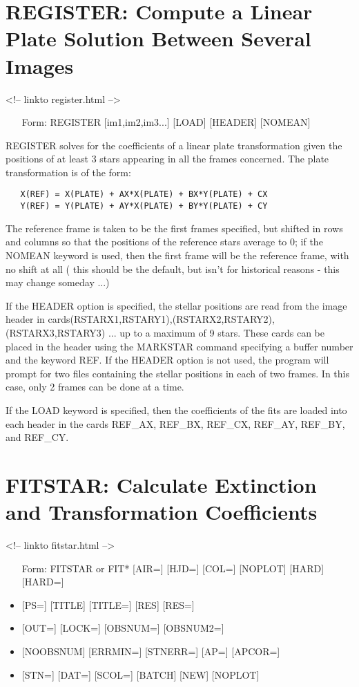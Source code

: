 \section{REGISTER: Compute a Linear Plate Solution Between Several Images}
\begin{rawhtml}
<!-- linkto register.html -->
\end{rawhtml}
\begin{itemize}
  \item[Form: REGISTER {[im1,im2,im3...]} {[LOAD]} {[HEADER]} {[NOMEAN]}\hfill]{}
\end{itemize}

REGISTER solves for the coefficients of a linear plate transformation given
the positions of at least 3 stars appearing in all the frames
concerned. The plate transformation is of the form:
\begin{verbatim}
   X(REF) = X(PLATE) + AX*X(PLATE) + BX*Y(PLATE) + CX
   Y(REF) = Y(PLATE) + AY*X(PLATE) + BY*Y(PLATE) + CY
\end{verbatim}
The reference frame is taken to be the first frames specified, but shifted
in rows and columns so that the positions of the reference stars average to
0; if the NOMEAN keyword is used, then the first frame will be the
reference frame, with no shift at all ( this should be the default, but
isn't for historical reasons - this may change someday ...)

If the HEADER option is specified, the stellar positions are read from the
image header in cards(RSTARX1,RSTARY1),(RSTARX2,RSTARY2), (RSTARX3,RSTARY3)
... up to a maximum of 9 stars.  These cards can be placed in the header
using the MARKSTAR command specifying a buffer number and the keyword
REF. If the HEADER option is not used, the program will prompt for two
files containing the stellar positions in each of two frames. In this case,
only 2 frames can be done at a time.

If the LOAD keyword is specified, then the coefficients of the fits are
loaded into each header in the cards REF\_AX, REF\_BX, REF\_CX, REF\_AY,
REF\_BY, and REF\_CY.

\section{FITSTAR: Calculate Extinction and Transformation Coefficients}
\begin{rawhtml}
<!-- linkto fitstar.html -->
\end{rawhtml}
\begin{itemize}
  \item[Form: FITSTAR or FIT* {[AIR=]} {[HJD=]} {[COL=]} {[NOPLOT]} {[HARD]} {[HARD=]}\hfill]{}
  \item{{[PS=]} {[TITLE]} {[TITLE=]} {[RES]} {[RES=]} }
  \item{{[OUT=]} {[LOCK=]} {[OBSNUM=]} {[OBSNUM2=]}}
  \item{{[NOOBSNUM]} {[ERRMIN=]} {[STNERR=]} {[AP=]} {[APCOR=]}}
  \item{{[STN=]} {[DAT=]} {[SCOL=]} {[BATCH]} {[NEW]} {[NOPLOT]} }
\end{itemize}

